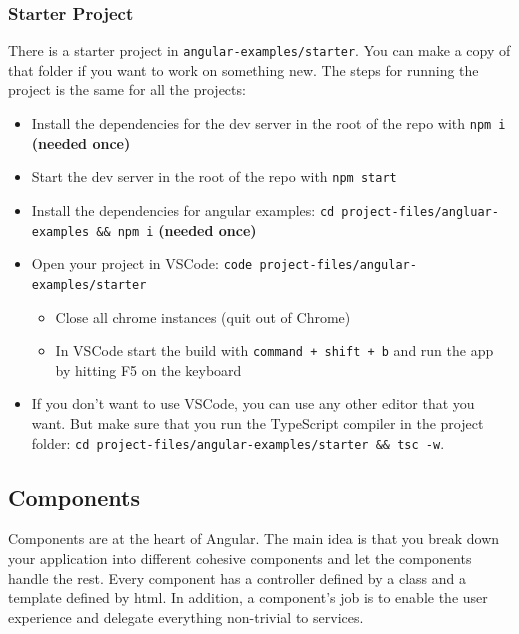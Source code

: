 \documentclass[12pt,]{article}
\providecommand{\tightlist}{%
  \setlength{\itemsep}{0pt}\setlength{\parskip}{0pt}}
\begin{document}
\subsubsection{Starter Project}\label{starter-project}

There is a starter project in \texttt{angular-examples/starter}. You can
make a copy of that folder if you want to work on something new. The
steps for running the project is the same for all the projects:

\begin{itemize}
\tightlist
\item
  Install the dependencies for the dev server in the root of the repo
  with \texttt{npm\ i} \textbf{(needed once)}
\item
  Start the dev server in the root of the repo with \texttt{npm\ start}
\item
  Install the dependencies for angular examples:
  \texttt{cd\ project-files/angluar-examples\ \&\&\ npm\ i}
  \textbf{(needed once)}
\item
  Open your project in VSCode:
  \texttt{code\ project-files/angular-examples/starter}

  \begin{itemize}
  \tightlist
  \item
    Close all chrome instances (quit out of Chrome)
  \item
    In VSCode start the build with \texttt{command\ +\ shift\ +\ b} and
    run the app by hitting F5 on the keyboard
  \end{itemize}
\item
  If you don't want to use VSCode, you can use any other editor that you
  want. But make sure that you run the TypeScript compiler in the
  project folder:
  \texttt{cd\ project-files/angular-examples/starter\ \&\&\ tsc\ -w}.
\end{itemize}

\subsection{Components}\label{components}

Components are at the heart of Angular. The main idea is that you break
down your application into different cohesive components and let the
components handle the rest. Every component has a controller defined by
a class and a template defined by html. In addition, a component's job
is to enable the user experience and delegate everything non-trivial to
services.
\end{document}
